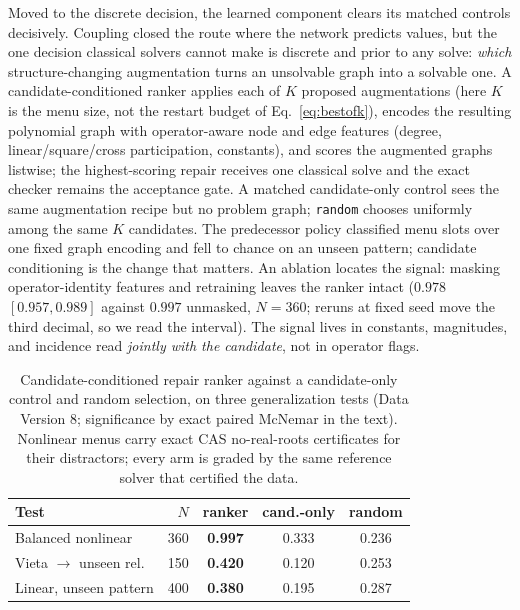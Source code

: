 \documentclass[letterpaper]{article} %
\begin{document}
Moved to the discrete decision, the learned component clears its matched controls decisively.
Coupling closed the route where the network predicts values, but the one decision classical
solvers cannot make is discrete and prior to any solve: \emph{which} structure-changing
augmentation turns an unsolvable graph into a solvable one. A candidate-conditioned
ranker applies each of $K$ proposed augmentations (here $K$ is the menu size, not the restart
budget of Eq.~\eqref{eq:bestofk}), encodes the resulting polynomial graph with operator-aware
node and edge features (degree, linear/square/cross participation, constants), and scores the
augmented graphs listwise; the highest-scoring repair receives one classical solve and the
exact checker remains the acceptance gate. A matched candidate-only control sees the same augmentation recipe but no problem graph;
\texttt{random} chooses uniformly among the same $K$ candidates. The predecessor policy classified menu slots over one fixed graph encoding and fell to chance
on an unseen pattern; candidate conditioning is the change that matters.
An ablation locates the signal: masking operator-identity features and
retraining leaves the ranker intact ($0.978$ $[0.957, 0.989]$ against $0.997$ unmasked,
$N{=}360$; reruns at fixed seed move the third decimal, so we read the interval). The signal lives in constants, magnitudes, and incidence read
\emph{jointly with the candidate}, not in operator flags.

\begin{table}[t]
\centering
\caption{Candidate-conditioned repair ranker against a candidate-only control and random
selection, on three generalization tests (Data Version 8; significance by exact paired McNemar in
the text). Nonlinear menus
carry exact CAS no-real-roots certificates for their distractors; every arm is graded by the
same reference solver that certified the data.}
\label{tab:repair}
\footnotesize
\setlength{\tabcolsep}{3.5pt}
\begin{tabular}{lrccc}
\toprule
Test & $N$ & ranker & cand.-only & random \\
\midrule
Balanced nonlinear      & 360 & \textbf{0.997} & 0.333 & 0.236 \\
Vieta $\to$ unseen rel.\ & 150 & \textbf{0.420} & 0.120 & 0.253 \\
Linear, unseen pattern  & 400 & \textbf{0.380} & 0.195 & 0.287 \\
\bottomrule
\end{tabular}
\end{table}
\end{document}

